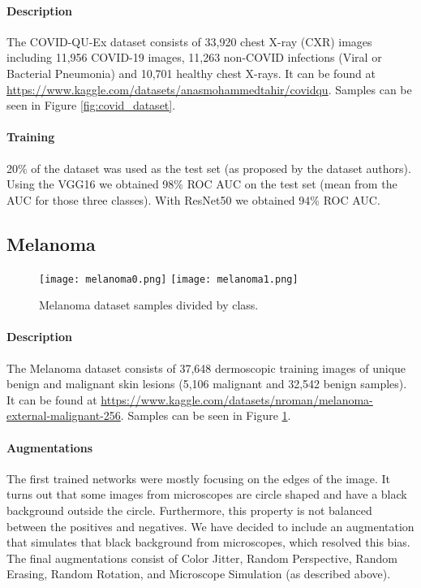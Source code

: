 \documentclass[twoside,11pt]{article}
\begin{document}
\paragraph{Description}
The COVID-QU-Ex dataset \citep{covid} consists of 33,920 chest X-ray (CXR) images including
11,956 COVID-19 images,
11,263 non-COVID infections (Viral or Bacterial Pneumonia) and
10,701 healthy chest X-rays.
It can be found at \url{https://www.kaggle.com/datasets/anasmohammedtahir/covidqu}.
Samples can be seen in Figure \ref{fig:covid_dataset}.
\paragraph{Training}
20\% of the dataset was used as the test set (as proposed by the dataset authors).
Using the VGG16 we obtained 98\% ROC AUC on the test set (mean from the AUC for those three classes).
With ResNet50 we obtained 94\% ROC AUC.

\subsection{Melanoma}
\begin{figure}[t]
    \centering
    \texttt{[image: melanoma0.png]}
    \texttt{[image: melanoma1.png]}
    \caption{Melanoma dataset samples divided by class.}
    \label{fig:melanoma_dataset}
\end{figure}
\paragraph{Description}
The Melanoma dataset \citep{melanoma} consists of 37,648 dermoscopic training images of unique benign and malignant skin lesions (5,106 malignant and 32,542 benign samples).
It can be found at \url{https://www.kaggle.com/datasets/nroman/melanoma-external-malignant-256}.
Samples can be seen in Figure \ref{fig:melanoma_dataset}.
\paragraph{Augmentations}
The first trained networks were mostly focusing on the edges of the image. It turns out that some images from microscopes are circle shaped and have a black background outside the circle. Furthermore, this property is not balanced between the positives and negatives. We have decided to include an augmentation that simulates that black background from microscopes, which resolved this bias. The final augmentations consist of Color Jitter, Random Perspective, Random Erasing, Random Rotation, and Microscope Simulation (as described above).
\end{document}
